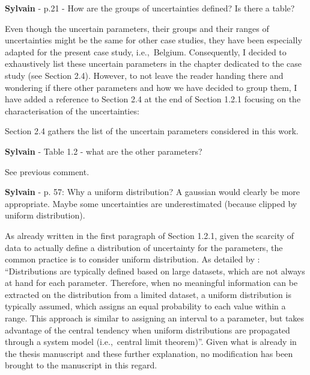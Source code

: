 \documentclass[12pt,a4paper]{article}
\def\ie{i.e.,\ }
\begin{document}
\begin{mdframed}[style=comment] %
{\color{purple} \textbf{Sylvain}} - p.21 - How are the groups of uncertainties defined? Is there a table?
\end{mdframed}

\noindent Even though the uncertain parameters, their groups and their ranges of uncertainties might be the same for other case studies, they have been especially adapted for the present case study, \ie Belgium. Consequently, I decided to exhaustively list these uncertain parameters in the chapter dedicated to the case study (see Section 2.4). However, to not leave the reader handing there and wondering if there other parameters and how we have decided to group them, I have added a reference to Section 2.4 {\color{blue}at the end of Section 1.2.1} focusing on the characterisation of the uncertainties:

\begin{mdframed}[style=manuscript] %
Section 2.4 gathers the list of the uncertain parameters considered in this work.
\end{mdframed}

\begin{mdframed}[style=comment] %
{\color{purple} \textbf{Sylvain}} - Table 1.2 - what are the other parameters?
\end{mdframed}

\noindent See previous comment.

\begin{mdframed}[style=comment] %
{\color{purple} \textbf{Sylvain}} - p. 57: Why a uniform distribution? A gaussian would clearly be more appropriate. Maybe some uncertainties are underestimated (because clipped by uniform distribution).
\end{mdframed}

\noindent As already written in the first paragraph of Section 1.2.1, given the scarcity of data to actually define a distribution of uncertainty for the parameters, the common practice is to consider uniform distribution. As detailed by \citet{coppittersthesis}: ``Distributions are typically defined based on large datasets, which are not always at hand for each parameter. Therefore, when no meaningful information can be extracted on the distribution from a limited dataset, a uniform distribution is typically assumed, which assigns an equal probability to each value within a range. This approach is similar to assigning an interval to a parameter, but takes advantage of the central tendency when uniform distributions are propagated through a system model (\ie central limit theorem)''. Given what is already in the thesis manuscript and these further explanation, no modification has been brought to the manuscript in this regard. 
\end{document}
